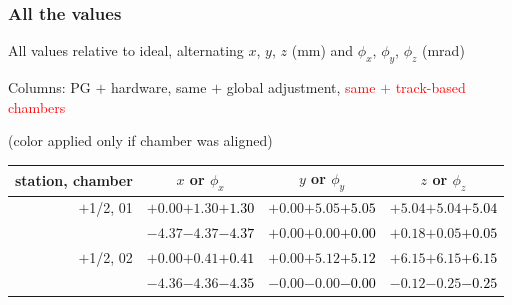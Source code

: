 \documentclass[compress]{beamer}
\begin{document}
\begin{frame}
\frametitle{All the values}
\tiny

All values relative to ideal, alternating $x$, $y$, $z$ (mm) and $\phi_x$, $\phi_y$, $\phi_z$ (mrad)

Columns: PG $+$ hardware, same $+$ global adjustment, \textcolor{red}{same $+$ track-based chambers}

\hfill (color applied only if chamber was aligned)

\vfill
\renewcommand{\arraystretch}{1.1}
\begin{tabular}{r | c | c | c}
station, chamber & $x$ or $\phi_x$ & $y$ or $\phi_y$ & $z$ or $\phi_z$ \\\hline
$+$1/2, 01 & $+0.00$\hspace{0.1 cm}$+1.30$\hspace{0.1 cm}\textcolor{black}{$+1.30$} & $+0.00$\hspace{0.1 cm}$+5.05$\hspace{0.1 cm}\textcolor{black}{$+5.05$} & $+5.04$\hspace{0.1 cm}$+5.04$\hspace{0.1 cm}\textcolor{black}{$+5.04$} \\
           & $-4.37$\hspace{0.1 cm}$-4.37$\hspace{0.1 cm}\textcolor{black}{$-4.37$} & $+0.00$\hspace{0.1 cm}$+0.00$\hspace{0.1 cm}\textcolor{black}{$+0.00$} & $+0.18$\hspace{0.1 cm}$+0.05$\hspace{0.1 cm}\textcolor{black}{$+0.05$} \\
$+$1/2, 02 & $+0.00$\hspace{0.1 cm}$+0.41$\hspace{0.1 cm}\textcolor{black}{$+0.41$} & $+0.00$\hspace{0.1 cm}$+5.12$\hspace{0.1 cm}\textcolor{black}{$+5.12$} & $+6.15$\hspace{0.1 cm}$+6.15$\hspace{0.1 cm}\textcolor{black}{$+6.15$} \\
           & $-4.36$\hspace{0.1 cm}$-4.36$\hspace{0.1 cm}\textcolor{black}{$-4.35$} & $-0.00$\hspace{0.1 cm}$-0.00$\hspace{0.1 cm}\textcolor{black}{$-0.00$} & $-0.12$\hspace{0.1 cm}$-0.25$\hspace{0.1 cm}\textcolor{black}{$-0.25$} \\

\end{tabular}
\end{frame}
\end{document}
